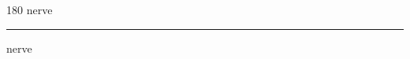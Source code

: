 
\begin{frame}
\begin{center}
\begin{turn}{180}
{\fontsize{2.5cm}{1em}\selectfont nerve}
\end{turn}
\vspace{1em}\par  
\hrule
\vspace{1em}\par  
{\fontsize{2.5cm}{1em}\selectfont nerve}
\end{center}
\end{frame}
